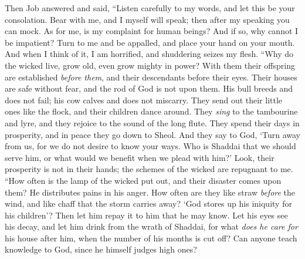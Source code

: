 \begin{biblechapter} %
 Then Job answered and said,
\verse “Listen carefully to my words, 
and let this be your consolation.
\verse Bear with me, and I myself will speak; 
then after my speaking you can mock.
\verse As for me, is my complaint for human beings? 
And if so, why cannot I be impatient?
\verse Turn to me and be appalled, 
and place your hand on your mouth.
\verse And when I think of it, I am horrified, 
and shuddering seizes my flesh.
\verse “Why do the wicked live, 
grow old, even grow mighty in power?
\verse With them their offspring are established \textit{before them}, 
and their descendants before their eyes.
\verse Their houses are safe without fear, 
and the rod of God is not upon them.
\verse His bull breeds and does not fail; 
his cow calves and does not miscarry.
\verse They send out their little ones like the flock, 
and their children dance around.
\verse They \textit{sing} to the tambourine and lyre, 
and they rejoice to the sound of the long flute.
\verse They spend their days in prosperity, 
and in peace they go down to Sheol.
\verse And they say to God, ‘Turn away from us, 
for we do not desire to know your ways.
\verse Who is Shaddai that we should serve him, 
or what would we benefit when we plead with him?’
\verse Look, their prosperity is not in their hands; 
the schemes of the wicked are repugnant to me.
\verse “How often is the lamp of the wicked put out, 
and their disaster comes upon them? 
He distributes pains in his anger.
\verse How often are they like straw \textit{before} the wind, 
and like chaff that the storm carries away?
\verse ‘God stores up his iniquity for his children’? 
Then let him repay it to him that he may know.
\verse Let his eyes see his decay, 
and let him drink from the wrath of Shaddai,
\verse for what \textit{does he care for} his house after him, 
when the number of his months is cut off?
\verse Can anyone teach knowledge to God, 
since he himself judges high ones?

\end{biblechapter}

